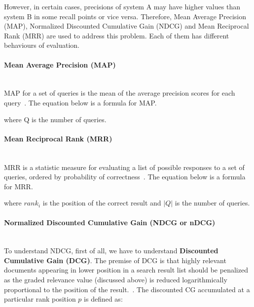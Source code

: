 However, in certain cases, precisions of system A may have higher values than system B in some recall points or vice versa. Therefore,
Mean Average Precision (MAP), Normalized Discounted Cumulative Gain (NDCG) and Mean Reciprocal Rank (MRR) are used to address this problem.
Each of them has different behaviours of evaluation.

\paragraph{Mean Average Precision (MAP)} \hspace{0pt} \\
MAP for a set of queries is the mean of the average precision scores for each query~\cite{IR}. The equation below is
a formula for MAP.
\begin{center}
\end{center}
where Q is the number of queries.

\paragraph{Mean Reciprocal Rank (MRR)} \hspace{0pt} \\
MRR is a statistic measure for evaluating a list of possible responses to a set of queries, ordered by 
probability of correctness~\cite{mrr}. The equation below is a formula for MRR.
\begin{center}
\end{center}
where $rank_i$ is the position of the correct result and $|Q|$ is the number of queries.

\paragraph{Normalized Discounted Cumulative Gain (NDCG or nDCG)} \hspace{0pt} \\
To understand NDCG, first of all, we have to understand \textbf{Discounted Cumulative Gain (DCG)}. 
The premise of DCG is that highly relevant documents appearing in lower position in a search result list should be penalized as 
the graded relevance value (discussed above) is 
reduced logarithmically proportional to the position of the result.~\cite{ndcg}. The discounted CG accumulated at a particular rank position
$p$ is defined as:

